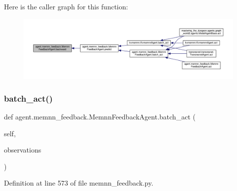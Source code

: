 Here is the caller graph for this function\+:
\nopagebreak
\begin{figure}[H]
\begin{center}
\leavevmode
\includegraphics[width=350pt]{classagent_1_1memnn__feedback_1_1MemnnFeedbackAgent_a694d5215e16fe557e56c1b0ca767e796_icgraph}
\end{center}
\end{figure}
\mbox{\label{classagent_1_1memnn__feedback_1_1MemnnFeedbackAgent_a0988c186c27ab70d318ea30e39a0a5cc}} 
\subsubsection{\texorpdfstring{batch\+\_\+act()}{batch\_act()}}
{\footnotesize\ttfamily def agent.\+memnn\+\_\+feedback.\+Memnn\+Feedback\+Agent.\+batch\+\_\+act (\begin{DoxyParamCaption}\item[{}]{self,  }\item[{}]{observations }\end{DoxyParamCaption})}



Definition at line 573 of file memnn\+\_\+feedback.\+py.



